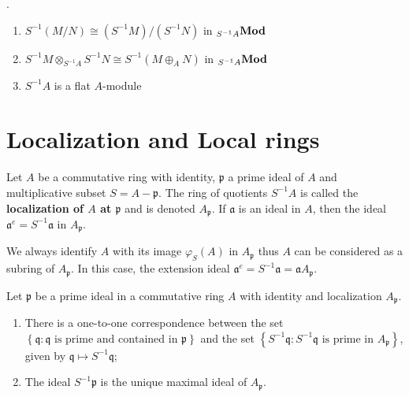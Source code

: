\begin{corollary}.
    \begin{enumerate}
        \item
              $S^{-1}(M / N)\cong \left(S^{-1} M\right) /\left(S^{-1} N\right)$ in ${}_{S^{-1} A}\mathbf{Mod}$
        \item
              $S^{-1}M\otimes_{S^{-1}A} S^{-1}N \cong S^{-1}(M \oplus_A N)$ in ${}_{S^{-1} A}\mathbf{Mod}$
        \item  $S^{-1}A$ is a flat $A$-module
    \end{enumerate}
\end{corollary}






\section{Localization and Local rings}
\begin{definition}
    Let $A$ be a commutative ring with identity, $\mathfrak{p}$ a prime ideal of $A$ and multiplicative subset $S=A-\mathfrak{p}$.
    The ring of quotients $S^{-1} A$ is called the \textbf{localization of $A$ at $\mathfrak{p}$} and is denoted $A_\mathfrak{p}$.
    If $\mathfrak{a}$ is an ideal in $A$, then the ideal $\mathfrak{a}^e=S^{-1} \mathfrak{a}$ in $A _\mathfrak{p}$.
    \begin{remark}
        We always identify $A$ with its image $\varphi_S(A)$ in $A_{\mathfrak{p}}$ thus $A$ can be considered as a subring of $A_{\mathfrak{p}}$. In this case, the extension ideal $\mathfrak{a}^e= S^{-1}\mathfrak{a}=\mathfrak{a}A_\mathfrak{p}$.
    \end{remark}
\end{definition}

\begin{theorem}
    Let $\mathfrak{p}$ be a prime ideal in a commutative ring $A$ with identity and localization $A_{\mathfrak{p}}$.
    \begin{enumerate}
        \item
              There is a one-to-one correspondence between the set $\left\{\mathfrak{q}: \mathfrak{q} \text{ is prime and contained in }\mathfrak{p} \right\}$ and the set $\left\{S^{-1}\mathfrak{q}: S^{-1}\mathfrak{q} \text{ is prime in } A_\mathfrak{p}\right\}$, given by $\mathfrak{q} \mapsto S^{-1}\mathfrak{q}$;
        \item
              The ideal $S^{-1}{\mathfrak{p}}$ is the unique maximal ideal of $A_{\mathfrak{p}}$.
    \end{enumerate}
\end{theorem}


